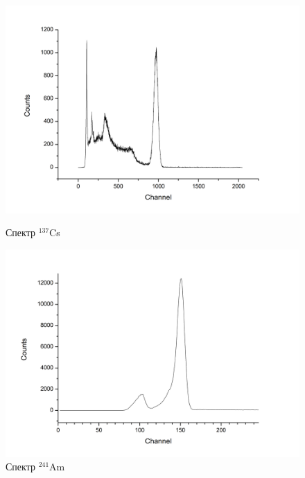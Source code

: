 \documentclass[a4paper]{article}
\begin{document}
\begin{figure}[ht]
\begin{center}
\begin{minipage}[ht]{0.48\linewidth}
\includegraphics[width=1\linewidth]{image/Cs.png}
\caption{Спектр $^{137}$Cs} %
\end{minipage}
\hfill 
\begin{minipage}[ht]{0.48\linewidth}
\includegraphics[width=1\linewidth]{image/Am.png}
\caption{Спектр $^{241}$Am}
\end{minipage}
\end{center}
\end{figure}
\end{document}
